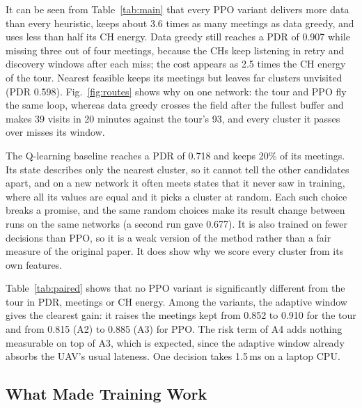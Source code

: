 \documentclass[conference]{IEEEtran}
\begin{document}
It can be seen from Table~\ref{tab:main} that every PPO variant delivers more data than every
heuristic, keeps about 3.6 times as many meetings as data greedy, and uses less than half its CH
energy. Data greedy still reaches a PDR of 0.907 while missing three out of four meetings,
because the CHs keep listening in retry and discovery windows after each miss; the cost appears
as 2.5 times the CH energy of the tour. Nearest feasible keeps its meetings but leaves far
clusters unvisited (PDR 0.598). Fig.~\ref{fig:routes} shows why on one network: the tour and PPO
fly the same loop, whereas data greedy crosses the field after the fullest buffer and makes 39
visits in 20 minutes against the tour's 93, and every cluster it passes over misses its window.

The Q-learning baseline reaches a PDR of 0.718 and keeps 20\% of its meetings. Its state
describes only the nearest cluster, so it cannot tell the other candidates apart, and on a new
network it often meets states that it never saw in training, where all its values are equal and
it picks a cluster at random. Each such choice breaks a promise, and the same random choices
make its result change between runs on the same networks (a second run gave 0.677). It is also
trained on fewer decisions than PPO, so it is a weak version of the method rather than a fair
measure of the original paper. It does show why we score every cluster from its own features.

Table~\ref{tab:paired} shows that no PPO variant is significantly different from the tour in
PDR, meetings or CH energy. Among the variants, the adaptive window gives the clearest gain: it
raises the meetings kept from 0.852 to 0.910 for the tour and from 0.815 (A2) to 0.885 (A3) for
PPO. The risk term of A4 adds nothing measurable on top of A3, which is expected, since the
adaptive window already absorbs the UAV's usual lateness. One decision takes 1.5\,ms on a laptop
CPU.

\subsection{What Made Training Work}
\end{document}
